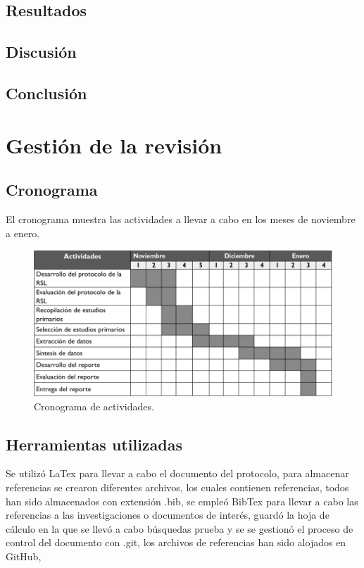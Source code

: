 \documentclass{article}
\begin{document}
\subsection{Resultados}
\subsection{Discusión}
\subsection{Conclusión}
\newpage

\section{Gestión de la revisión}

\subsection{Cronograma}
El cronograma muestra las actividades a llevar a cabo en los meses de noviembre a enero.

\begin{figure}[!htb]
    \includegraphics[width=\linewidth]{gant.png}
    \caption{Cronograma de actividades.}
    \label{fig:grant}
\end{figure}

\subsection{Herramientas utilizadas}
Se utilizó LaTex para llevar a cabo el documento del protocolo, para almacenar referencias 
se crearon diferentes archivos, los cuales contienen referencias, todos han sido 
almacenados con extensión .bib, se empleó BibTex para llevar a cabo las referencias a las 
investigaciones o documentos de interés, guardó la hoja de cálculo en la que se llevó 
a cabo búsquedas prueba y se se gestionó el proceso de control del documento con .git,
los archivos de referencias han sido alojados en GitHub,
\newpage
\end{document}
